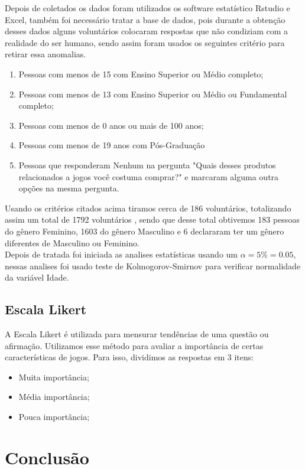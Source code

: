 \documentclass[11pt,a4paper]{article}
\begin{document}
Depois de coletados os dados foram utilizados os software estatístico Rstudio e Excel, também foi necessário tratar a base de dados, pois durante a obtenção desses dados alguns voluntários colocaram respostas que não condiziam com a realidade do ser humano, sendo assim foram usados os seguintes critério para retirar essa anomalias.
 \begin{enumerate}[label=(\roman*)]
\item Pessoas com menos de 15 com Ensino Superior ou Médio completo; 
\item Pessoas com menos de 13 com  Ensino Superior ou Médio  ou Fundamental completo;
\item Pessoas com menos de 0 anos ou mais de 100 anos;
\item Pessoas com menos de 19 anos com Pós-Graduação
\item Pessoas que responderam Nenhum na pergunta "Quais desses produtos relacionados a jogos você costuma comprar?"  e marcaram alguma outra opções na mesma pergunta.
\end{enumerate}
Usando os critérios citados acima tiramos cerca de 186 voluntários, totalizando assim um total de 1792 voluntários , sendo que desse total obtivemos 183 pessoas do gênero Feminino, 1603 do gênero Masculino e 6 declararam ter um gênero diferentes de Masculino  ou Feminino. 
\\

Depois de tratada foi iniciada as analises estatísticas usando um $\alpha=5\%=0.05$, nessas analises foi usado teste de Kolmogorov-Smirnov para verificar normalidade da variável Idade.

\subsection{Escala Likert}

A Escala Likert é utilizada para mensurar tendências de uma questão ou afirmação. Utilizamos esse método para avaliar a importância de certas características de jogos. Para isso, dividimos as respostas em 3 itens:

\begin{itemize}[noitemsep,nolistsep]
\item Muita importância; 
\item Média importância;
\item Pouca importância;
\end{itemize}
 
\section{Conclusão}
\end{document}
